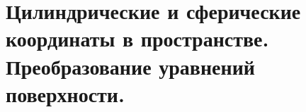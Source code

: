 \section{Цилиндрические и сферические координаты в пространстве. Преобразование уравнений поверхности.}

\pagebreak